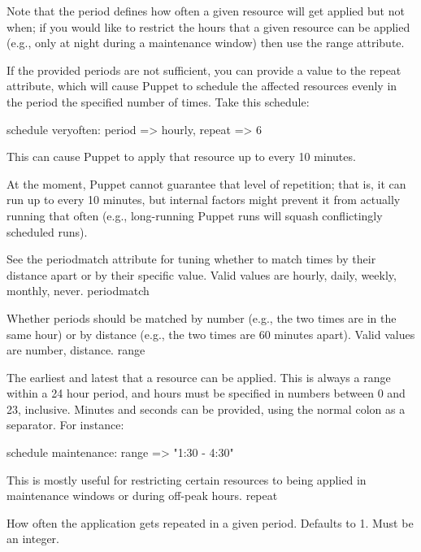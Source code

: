 Note that the period defines how often a given resource will get applied but not when; if you would like to restrict the hours that a given resource can be applied (e.g., only at night during a maintenance window) then use the range attribute.

If the provided periods are not sufficient, you can provide a value to the repeat attribute, which will cause Puppet to schedule the affected resources evenly in the period the specified number of times. Take this schedule:

schedule { veryoften:
  period => hourly,
  repeat => 6
}

This can cause Puppet to apply that resource up to every 10 minutes.

At the moment, Puppet cannot guarantee that level of repetition; that is, it can run up to every 10 minutes, but internal factors might prevent it from actually running that often (e.g., long-running Puppet runs will squash conflictingly scheduled runs).

See the periodmatch attribute for tuning whether to match times by their distance apart or by their specific value. Valid values are hourly, daily, weekly, monthly, never.
periodmatch

Whether periods should be matched by number (e.g., the two times are in the same hour) or by distance (e.g., the two times are 60 minutes apart). Valid values are number, distance.
range

The earliest and latest that a resource can be applied. This is always a range within a 24 hour period, and hours must be specified in numbers between 0 and 23, inclusive. Minutes and seconds can be provided, using the normal colon as a separator. For instance:

schedule { maintenance:
  range => "1:30 - 4:30"
}

This is mostly useful for restricting certain resources to being applied in maintenance windows or during off-peak hours.
repeat

How often the application gets repeated in a given period. Defaults to 1. Must be an integer.
